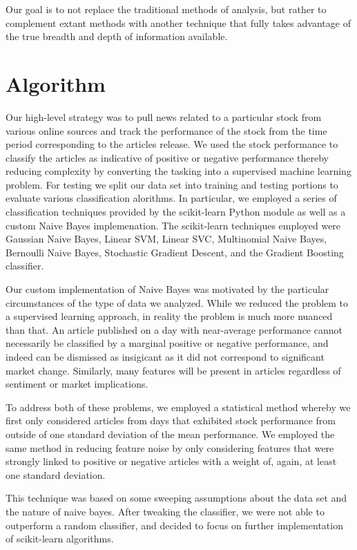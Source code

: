 \documentclass[letterpaper]{article}
\begin{document}
Our goal is to not replace the traditional methods of analysis, but rather to complement extant methods with another technique that fully takes advantage of the true breadth and depth of information available.

\section{Algorithm}
\noindent Our high-level strategy was to pull news related to a particular stock from various online sources and track the performance of the stock from the time period corresponding to the articles release.  We used the stock performance to classify the articles as indicative of positive or negative performance thereby reducing complexity by converting the tasking into a supervised machine learning problem. For testing we split our data set into training and testing portions to evaluate various classification alorithms. In particular, we employed a series of classification techniques provided by the scikit-learn Python module as well as a custom Naive Bayes implemenation.  The scikit-learn techniques employed were Gaussian Naive Bayes, Linear SVM, Linear SVC, Multinomial Naive Bayes, Bernoulli Naive Bayes, Stochastic Gradient Descent, and the Gradient Boosting classifier.

Our custom implementation of Naive Bayes was motivated by the particular circumstances of the type of data we analyzed.  While we reduced the problem to a supervised learning approach, in reality the problem is much more nuanced than that. An article published on a day with near-average performance cannot necessarily be classified by a marginal positive or negative performance, and indeed can be dismissed as insigicant as it did not correspond to significant market change. Similarly, many features will be present in articles regardless of sentiment or market implications.

To address both of these problems, we employed a statistical method whereby we first only considered articles from days that exhibited stock performance from outside of one standard deviation of the mean performance. We employed the same method in reducing feature noise by only considering features that were strongly linked to positive or negative articles with a weight of, again, at least one standard deviation.

This technique was based on some sweeping assumptions about the data set and the nature of naive bayes.  After tweaking the classifier, we were not able to outperform a random classifier, and decided to focus on further implementation of scikit-learn algorithms.
\end{document}
